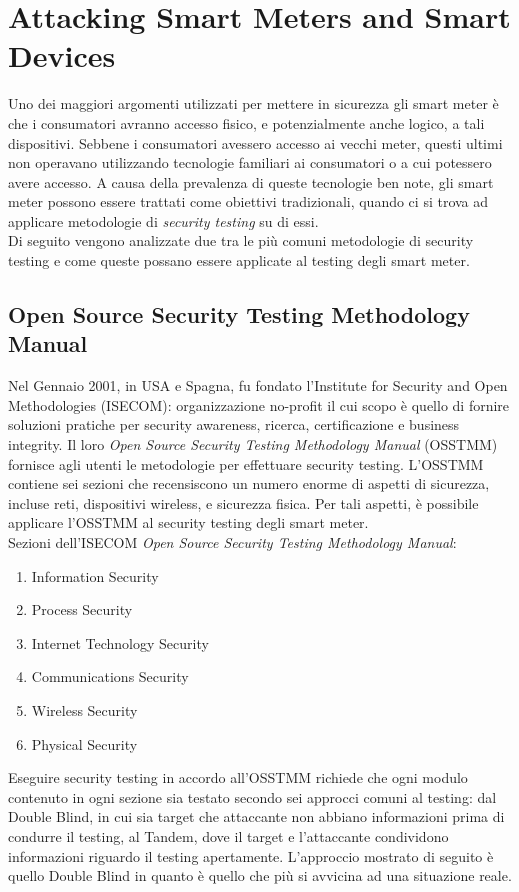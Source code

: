 \section{Attacking Smart Meters and Smart Devices}
Uno dei maggiori argomenti utilizzati per mettere in sicurezza gli smart meter è che i consumatori avranno accesso fisico, e potenzialmente anche logico, a tali dispositivi. Sebbene i consumatori avessero accesso ai vecchi meter, questi ultimi non operavano utilizzando tecnologie familiari ai consumatori o a cui potessero avere accesso. A causa della prevalenza di queste tecnologie ben note, gli smart meter possono essere trattati come obiettivi tradizionali, quando ci si trova ad applicare metodologie di \emph{security testing} su di essi.\\
Di seguito vengono analizzate due tra le più comuni metodologie di security testing e come queste possano essere applicate al testing degli smart meter.

\subsection{Open Source Security Testing Methodology Manual}
Nel Gennaio 2001, in USA e Spagna, fu fondato l'Institute for Security and Open Methodologies (ISECOM): organizzazione no-profit il cui scopo è quello di fornire soluzioni pratiche per security awareness, ricerca, certificazione e business integrity. Il loro \emph{Open Source Security Testing Methodology Manual} (OSSTMM) fornisce agli utenti le metodologie per effettuare security testing. L'OSSTMM contiene sei sezioni che recensiscono un numero enorme di aspetti di sicurezza, incluse reti, dispositivi wireless, e sicurezza fisica. Per tali aspetti, è possibile applicare l'OSSTMM al security testing degli smart meter.\\
Sezioni dell'ISECOM \emph{Open Source Security Testing Methodology Manual}:
\begin{enumerate}
	\item Information Security
	\item Process Security
	\item Internet Technology Security
	\item Communications Security
	\item Wireless Security
	\item Physical Security
\end{enumerate}
Eseguire security testing in accordo all'OSSTMM richiede che ogni modulo contenuto in ogni sezione sia testato secondo sei approcci comuni al testing: dal Double Blind, in cui sia target che attaccante non abbiano informazioni prima di condurre il testing, al Tandem, dove il target e l'attaccante condividono informazioni riguardo il testing apertamente. L'approccio mostrato di seguito è quello Double Blind in quanto è quello che più si avvicina ad una situazione reale.
